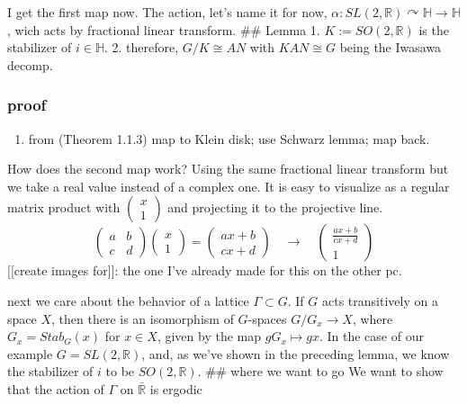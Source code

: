 \documentclass[
]{article}
\providecommand{\tightlist}{%
  \setlength{\itemsep}{0pt}\setlength{\parskip}{0pt}}
\begin{document}
I get the first map now. The action, let's name it for now,
\(\alpha : SL(2, \mathbb{R}) \curvearrowright \mathbb{H} \rightarrow \mathbb{H}\),
wich acts by fractional linear transform. \#\# Lemma 1.
\(K:= SO(2, \mathbb{R})\) is the stabilizer of \(i \in \mathbb{H}\). 2.
therefore, \(G/K \cong AN\) with \(KAN \cong G\) being the Iwasawa
decomp.

\hypertarget{proof}{%
\subsubsection{proof}\label{proof}}

\begin{enumerate}
\def\labelenumi{\arabic{enumi}.}
\tightlist
\item
  from \cite{Miyake89}(Theorem 1.1.3) map to Klein disk; use Schwarz
  lemma; map back.
\end{enumerate}

How does the second map work? Using the same fractional linear transform
but we take a real value instead of a complex one. It is easy to
visualize as a regular matrix product with
\(\begin{pmatrix}x \\ 1\end{pmatrix}\) and projecting it to the
projective line. \[
\begin{pmatrix}a & b \\ c & d\end{pmatrix}\begin{pmatrix}x \\ 1\end{pmatrix} =
\begin{pmatrix}ax + b \\ cx + d\end{pmatrix} \quad \rightarrow \quad
\begin{pmatrix}\frac{ax + b}{cx + d} \\ 1\end{pmatrix}
\] {[}{[}create images for{]}{]}: the one I've already made for this on
the other pc.

next we care about the behavior of a lattice \(\Gamma \subset G\). If
\(G\) acts transitively on a space \(X\), then there is an isomorphism
of \(G\)-spaces \(G/G_x \rightarrow X\), where \(G_x = Stab_G (x)\) for
\(x \in X\), given by the map \(gG_x \mapsto gx\). In the case of our
example \(G = SL(2, \mathbb{R})\), and, as we've shown in the preceding
lemma, we know the stabilizer of \(i\) to be \(SO(2,\mathbb{R})\). \#\#
where we want to go We want to show that the action of \(\Gamma\) on
\(\bar{\mathbb{R}}\) is ergodic
\end{document}
